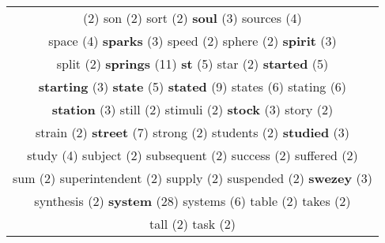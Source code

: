 \documentclass[12pt,a4paper]{article}
\begin{document}
\begin{center}
\begin{longtable}{|c|}
\footnotesize{(2)} {\footnotesize \textcolor{Verde} {son}} \footnotesize{(2)} {\footnotesize \textcolor{Verde} {sort}} \footnotesize{(2)} {\small \textcolor{Laranja} {\bf soul}} \footnotesize{(3)} {\normalsize \textcolor{VerdeLocao} {sources}} \footnotesize{(4)}  \\ {\normalsize \textcolor{VerdeLocao} {space}} \footnotesize{(4)} {\small \textcolor{Laranja} {\bf sparks}} \footnotesize{(3)} {\footnotesize \textcolor{Verde} {speed}} \footnotesize{(2)} {\footnotesize \textcolor{Verde} {sphere}} \footnotesize{(2)} {\small \textcolor{Laranja} {\bf spirit}} \footnotesize{(3)}  \\ {\footnotesize \textcolor{Verde} {split}} \footnotesize{(2)} {\Huge \textcolor{AzulEscuro} {\bf springs}} \footnotesize{(11)} {\large \textcolor{Roxo} {\bf st}} \footnotesize{(5)} {\footnotesize \textcolor{Verde} {star}} \footnotesize{(2)} {\large \textcolor{Roxo} {\bf started}} \footnotesize{(5)}  \\ {\small \textcolor{Laranja} {\bf starting}} \footnotesize{(3)} {\large \textcolor{Roxo} {\bf state}} \footnotesize{(5)} {\Huge \textcolor{AzulEscuro} {\bf stated}} \footnotesize{(9)} {\Large \textcolor{VermEscuro} {states}} \footnotesize{(6)} {\Large \textcolor{VermEscuro} {stating}} \footnotesize{(6)}  \\ {\small \textcolor{Laranja} {\bf station}} \footnotesize{(3)} {\footnotesize \textcolor{Verde} {still}} \footnotesize{(2)} {\footnotesize \textcolor{Verde} {stimuli}} \footnotesize{(2)} {\small \textcolor{Laranja} {\bf stock}} \footnotesize{(3)} {\footnotesize \textcolor{Verde} {story}} \footnotesize{(2)}  \\ {\footnotesize \textcolor{Verde} {strain}} \footnotesize{(2)} {\LARGE \textcolor{Rosa} {\bf street}} \footnotesize{(7)} {\footnotesize \textcolor{Verde} {strong}} \footnotesize{(2)} {\footnotesize \textcolor{Verde} {students}} \footnotesize{(2)} {\small \textcolor{Laranja} {\bf studied}} \footnotesize{(3)}  \\ {\normalsize \textcolor{VerdeLocao} {study}} \footnotesize{(4)} {\footnotesize \textcolor{Verde} {subject}} \footnotesize{(2)} {\footnotesize \textcolor{Verde} {subsequent}} \footnotesize{(2)} {\footnotesize \textcolor{Verde} {success}} \footnotesize{(2)} {\footnotesize \textcolor{Verde} {suffered}} \footnotesize{(2)}  \\ {\footnotesize \textcolor{Verde} {sum}} \footnotesize{(2)} {\footnotesize \textcolor{Verde} {superintendent}} \footnotesize{(2)} {\footnotesize \textcolor{Verde} {supply}} \footnotesize{(2)} {\footnotesize \textcolor{Verde} {suspended}} \footnotesize{(2)} {\small \textcolor{Laranja} {\bf swezey}} \footnotesize{(3)}  \\ {\footnotesize \textcolor{Verde} {synthesis}} \footnotesize{(2)} {\Huge \textcolor{AzulEscuro} {\bf system}} \footnotesize{(28)} {\Large \textcolor{VermEscuro} {systems}} \footnotesize{(6)} {\footnotesize \textcolor{Verde} {table}} \footnotesize{(2)} {\footnotesize \textcolor{Verde} {takes}} \footnotesize{(2)}  \\ {\footnotesize \textcolor{Verde} {tall}} \footnotesize{(2)} {\footnotesize \textcolor{Verde} {task}} \footnotesize{(2)} {\small \textcolor{Laranja} {\bf 
\end{longtable}
\end{center}
\end{document}

